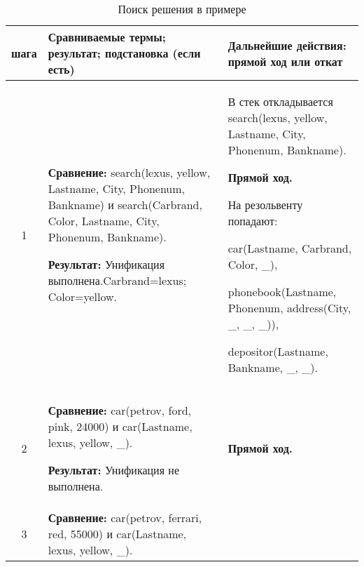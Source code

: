 \footnotesize
\begin{longtable}{|c|p{}|p{}|}
    \caption{Поиск решения в примере }\label{tbl:ex3} \\
    \hline
    \textnumero{} шага & Сравниваемые термы; результат; подстановка (если есть)  & Дальнейшие действия: прямой ход или откат \\
    \hline

    1
                       &
\textbf{Сравнение:} \newline
  search(lexus, yellow, Lastname, City, Phonenum, Bankname)
    \newline и \newline
    search(Carbrand, Color, Lastname, City, Phonenum, Bankname).
    \newline

    \textbf{Результат:} \newline
    Унификация выполнена.\newline{}Carbrand=lexus; Color=yellow.
                       &
    В стек откладывается\newline
  search(lexus, yellow, Lastname, City, Phonenum, Bankname).
    \newline

    \textbf{Прямой ход.}

    На резольвенту попадают:

    car(Lastname, Carbrand, Color, \_),

    phonebook(Lastname, Phonenum, address(City, \_, \_, \_)),

    depositor(Lastname, Bankname, \_, \_).
                       \\ \hline

    2
                       &
    \textbf{Сравнение:} \newline
  car(petrov, ford,    pink,   24000)
    \newline и \newline
    car(Lastname, lexus, yellow, \_).
    \newline

    \textbf{Результат:} \newline
    Унификация не выполнена.
                       &
    \textbf{Прямой ход.}
                       \\ \hline

    3
                       &
    \textbf{Сравнение:} \newline
  car(petrov, ferrari, red,    55000)
    \newline и \newline
    car(Lastname, lexus, yellow, \_).
    \newline


\end{longtable}
